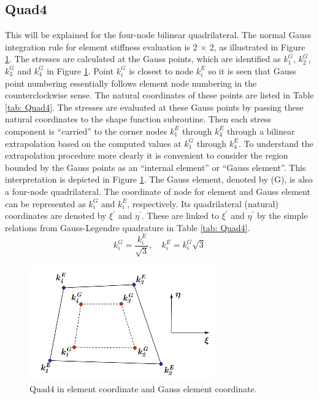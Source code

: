 \subsection{Quad4}
This will be explained for the four-node bilinear quadrilateral. The normal Gauss integration rule for element stiffness evaluation is 2 $\times$ 2, as illustrated in Figure \ref{fig: Quad4_1}. The stresses are calculated at the Gauss points, which are identified as $k_1^G$, $k_2^G$, $k_3^G$ and $k_4^G$ in Figure \ref{fig: Quad4_1}. Point $k_i^G$ is closest to node $k_i^E$ so it is seen that Gauss point numbering essentially follows element node numbering in the counterclockwise sense. The natural coordinates of these points are listed in Table \ref{tab: Quad4}. The stresses are evaluated at these Gauss points by passing these natural coordinates to the shape function subroutine. Then each stress component is “carried” to the corner nodes $k_1^E$ through $k_4^E$ through a bilinear extrapolation based on the computed values at $k_1^G$ through $k_4^E$. To understand the extrapolation procedure more clearly it is convenient to consider the region bounded by the Gauss points as an “internal element” or “Gauss element”. This interpretation is depicted in Figure \ref{fig: Quad4_1}. The Gauss element, denoted by (G), is also a four-node quadrilateral. The coordinate of node for element and Gauss element can be represented as $k_i^G$ and $k_i^E$, respectively. Its quadrilateral (natural) coordinates are denoted by $\xi^{\prime}$ and $\eta^{\prime}$.  These are linked to $\xi^{\prime}$ and $\eta^{\prime}$ by the simple relations from Gauss-Legendre quadrature in Table \ref{tab: Quad4}.
\begin{equation}
k_i^G = \frac{k_i^E}{\sqrt{3}},\quad
k_i^E= k_i^G\sqrt{3}
\end{equation}




\begin{figure}[h]
	\begin{center}
		\includegraphics[width=8cm,clip]{Quad4_1.pdf}			
		\caption{Quad4 in element coordinate and Gauss element coordinate.}	\label{fig: Quad4_1}
	\end{center} 
\end{figure}

